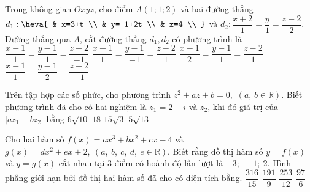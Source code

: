 \begin{ex} %
Trong không gian $Oxyz$, cho điểm $A( 1;1;2 )$ và hai đường thẳng ${{d}_{1}}:\heva{
& x=3+t \\ 
& y=-1+2t \\ 
& z=4 \\ 
}$ và ${{d}_{2}}:\dfrac{x+2}{1}=\dfrac{y}{1}=\dfrac{z-2}{2}$. Đường thẳng qua $A$, cắt đường thẳng ${{d}_{1}},{{d}_{2}}$ có phương trình là
\choice 
{ $\dfrac{x-1}{1}=\dfrac{y-1}{1}=\dfrac{z-2}{-1}$}
{ $\dfrac{x-1}{1}=\dfrac{y-1}{-1}=\dfrac{z-2}{1}$} 
{\True $\dfrac{x-1}{2}=\dfrac{y-1}{1}=\dfrac{z-2}{1}$}
{ $\dfrac{x-1}{1}=\dfrac{y-1}{2}=\dfrac{z-2}{-1}$} 
\end{ex} 
\begin{ex} %
Trên tập hợp các số phức, cho phương trình ${{z}^2}+az+b=0,\,\,( a,\,b\in \mathbb{R} )$. Biết phương trình đã cho có hai nghiệm là ${{z}_{1}}=2-i$ và ${{z}_{2}}$, khi đó giá trị của $\bigg| a{{z}_{1}}-b{{z}_{2}} \bigg|$ bằng 
\choice 
{ $6\sqrt{10}$}
{ $18$}
{ $15\sqrt{3}$}
{\True $5\sqrt{13}$} 
\end{ex} 
\begin{ex} %
Cho hai hàm số $f( x )=ax^3+bx^2+cx-4$ và $g( x )=dx^2+ex+2,\ ( a,\ b,\ c,\ d,\ e\in \mathbb{R} )$. Biết rằng đồ thị hàm số $y=f( x )$ và $y=g( x )$ cắt nhau tại $3$ điểm có hoành độ lần lượt là $-3;\ -1;\ 2$. Hình phẳng giới hạn bởi đồ thị hai hàm số đã cho có diện tích bằng.
\choice 
{ $\dfrac{316}{15}$}
{ $\dfrac{191}{9}$}
{ \True $\dfrac{253}{12}$}
{ $\dfrac{97}{6}$} 
\end{ex}
